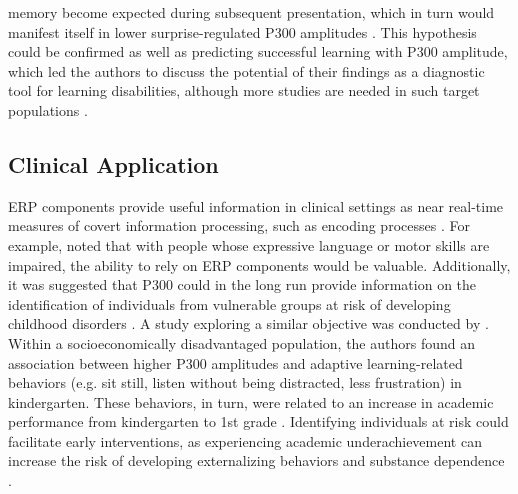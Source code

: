 memory become expected during subsequent presentation, which in turn would manifest itself in lower surprise-regulated P300 amplitudes \parencite{steinemannTrackingNeuralCorrelates2016}. This hypothesis could be confirmed as well as predicting successful learning with P300 amplitude, which led the authors to discuss the potential of their findings as a diagnostic tool for learning disabilities, although more studies are needed in such target populations \parencite{steinemannTrackingNeuralCorrelates2016}. 

\subsection{Clinical Application}
ERP components provide useful information in clinical settings as near real-time measures of covert information processing, such as encoding processes \parencite{friedmanEventrelatedPotentialERP2000}. For example, \textcite{rigginsP300DevelopmentInfancy2020} noted that with people whose expressive language or motor skills are impaired, the ability to rely on ERP components would be valuable. Additionally, it was suggested that P300 could in the long run provide information on the identification of individuals from vulnerable groups at risk of developing childhood disorders \parencite{duncanEventrelatedPotentialsClinical2009}. A study exploring a similar objective was conducted by \textcite{willnerRelevanceNeurophysiologicalMarker2015}. Within a socioeconomically disadvantaged population, the authors found an association between higher P300 amplitudes and adaptive learning-related behaviors (e.g. sit still, listen without being distracted, less frustration) in kindergarten. These behaviors, in turn, were related to an increase in academic performance from kindergarten to 1st grade \parencite{willnerRelevanceNeurophysiologicalMarker2015}. Identifying individuals at risk could facilitate early interventions, as experiencing academic underachievement can increase the risk of developing externalizing behaviors and substance dependence \parencite{crumAssociationEducationalAchievement1998, hinshawExternalizingBehaviorProblems1992}.
